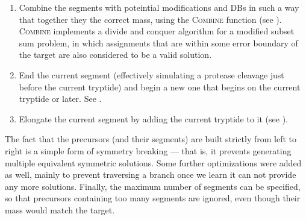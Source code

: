 \begin{enumerate}
  \item Combine the  segments with poteintial modifications and DBs in such a way that together they the correct mass, using the \textsc{Combine} function (see ). \textsc{Combine} implements a divide and conquer algorithm for a modified subset sum problem, in which assignments that are within some error boundary of the target are also considered to be a valid solution.
  \item End the current segment (effectively simulating a protease cleavage just before the current tryptide) and begin a new one that begins on the current tryptide or later. See .
  \item Elongate the current segment by adding the current tryptide to it (see ).
\end{enumerate}

The fact that the precursors (and their segments) are built strictly from left to right is a simple form of symmetry breaking --- that is, it prevents generating multiple equivalent symmetric solutions. Some further optimizations were added as well, mainly to prevent traversing a branch once we learn it can not provide any more solutions. Finally, the maximum number of segments can be specified, so that precursors containing too many segments are ignored, even though their mass would match the target.


